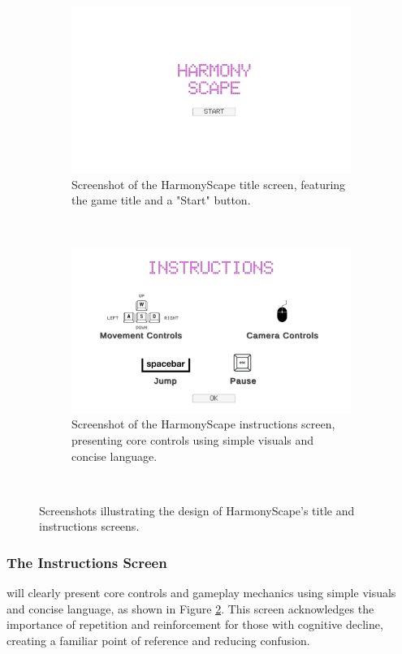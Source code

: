 \documentclass{l4proj}
\begin{document}
\begin{figure}[h]
  \centering
  \begin{subfigure}[t]{0.45\textwidth}
    \includegraphics[width=\textwidth]{dissertation/images/title_screen.png}
    \caption{Screenshot of the HarmonyScape title screen, featuring the game title and a "Start" button.}
    \label{fig:title_screen}
  \end{subfigure}
  ~ 
  \begin{subfigure}[t]{0.45\textwidth}
    \includegraphics[width=\textwidth]{dissertation/images/instructions_screen.png} 
    \caption{Screenshot of the HarmonyScape instructions screen, presenting core controls using simple visuals and concise language.}
    \label{fig:instructions_screen}
  \end{subfigure}
  ~  
  \caption{Screenshots illustrating the design of HarmonyScape's title and instructions screens. }
  \label{fig:intro_screens}
\end{figure}

\subsubsection{The Instructions Screen} will clearly present core controls and gameplay mechanics using simple visuals and concise language, as shown in Figure \ref{fig:instructions_screen}. This screen acknowledges the importance of repetition and reinforcement for those with cognitive decline, creating a familiar point of reference and reducing confusion.
\end{document}
